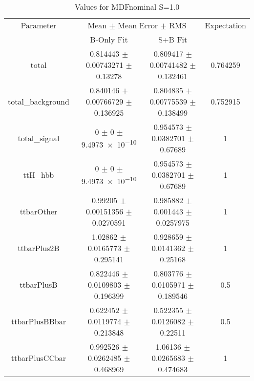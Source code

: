 \begin{table}
\centering
\caption{Values for MDFnominal S=1.0}
\begin{tabular}{cccc}
\toprule
Parameter & \multicolumn{2}{c}{Mean $\pm$ Mean Error $\pm$ RMS} & Expectation\\
 & B-Only Fit & S+B Fit & \\
\midrule
total & \num{0.814443} $\pm$ \num{0.00743271} $\pm$ \num{0.13278} & \num{0.809417} $\pm$ \num{0.00741482} $\pm$ \num{0.132461} & \num{0.764259}\\
total\_background & \num{0.840146} $\pm$ \num{0.00766729} $\pm$ \num{0.136925} & \num{0.804835} $\pm$ \num{0.00775539} $\pm$ \num{0.138499} & \num{0.752915}\\
total\_signal & \num{0} $\pm$ \num{0} $\pm$ \num{9.4973e-10} & \num{0.954573} $\pm$ \num{0.0382701} $\pm$ \num{0.67689} & \num{1}\\
ttH\_hbb & \num{0} $\pm$ \num{0} $\pm$ \num{9.4973e-10} & \num{0.954573} $\pm$ \num{0.0382701} $\pm$ \num{0.67689} & \num{1}\\
ttbarOther & \num{0.99205} $\pm$ \num{0.00151356} $\pm$ \num{0.0270591} & \num{0.985882} $\pm$ \num{0.001443} $\pm$ \num{0.0257975} & \num{1}\\
ttbarPlus2B & \num{1.02862} $\pm$ \num{0.0165773} $\pm$ \num{0.295141} & \num{0.928659} $\pm$ \num{0.0141362} $\pm$ \num{0.25168} & \num{1}\\
ttbarPlusB & \num{0.822446} $\pm$ \num{0.0109803} $\pm$ \num{0.196399} & \num{0.803776} $\pm$ \num{0.0105971} $\pm$ \num{0.189546} & \num{0.5}\\
ttbarPlusBBbar & \num{0.622452} $\pm$ \num{0.0119774} $\pm$ \num{0.213848} & \num{0.522355} $\pm$ \num{0.0126082} $\pm$ \num{0.22511} & \num{0.5}\\
ttbarPlusCCbar & \num{0.992526} $\pm$ \num{0.0262485} $\pm$ \num{0.468969} & \num{1.06136} $\pm$ \num{0.0265683} $\pm$ \num{0.474683} & \num{1}\\
\bottomrule
\end{tabular}
\end{table}